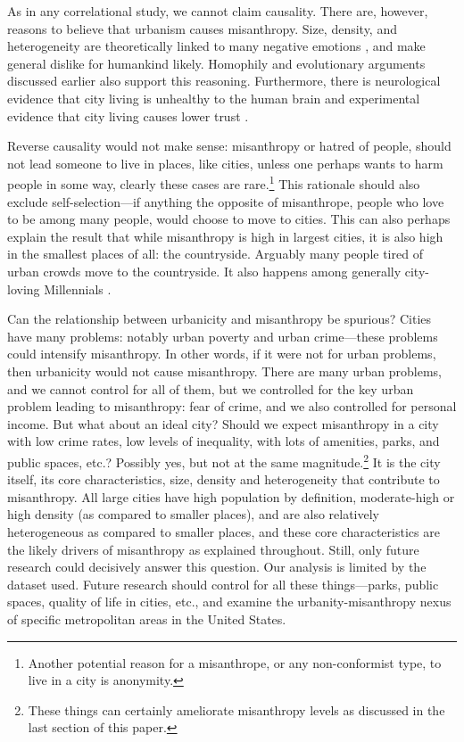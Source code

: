 \documentclass[11pt, letterpaper]{article}
\begin{document}
\begin{spacing}{1.4}
As in any correlational study, we cannot claim causality. There are, however, reasons to believe that urbanism causes misanthropy. Size, density, and heterogeneity are theoretically linked to many negative emotions \citep{wirth38}, and make general dislike for humankind likely. Homophily and evolutionary arguments discussed earlier also support this reasoning.  
Furthermore, there is neurological evidence that city living is unhealthy to the human brain \citep{lederbogen11} and experimental evidence that city living causes lower trust \citep{milgram70}.

Reverse causality would not make sense: misanthropy or hatred of people, should not lead someone to live in places, like cities, unless one perhaps wants to harm people in some way, clearly these cases are rare.\footnote{Another potential reason for a misanthrope, or any non-conformist type, to live in a city is anonymity.} This rationale should also exclude self-selection---if anything the opposite of misanthrope, people who love to be among many people, would choose to move to cities. This can also perhaps explain the result that while misanthropy is high in largest
cities, it is also high in the smallest places of all: the
countryside. {Arguably many people tired of urban crowds move to the
  countryside. It also happens among generally city-loving Millennials  \citep[e.g.,][]{deweyWP17nov23}.}

Can the relationship between urbanicity and misanthropy be spurious? Cities have many problems: notably urban poverty and urban crime---these problems could intensify misanthropy. In other words, if it were not for urban problems, then urbanicity would not cause misanthropy. There are many urban problems, and we cannot control for all of them, but we controlled for the key urban problem leading to misanthropy: fear of crime, and we also controlled for personal income. 
But what about an ideal city? Should we expect misanthropy in a city with low crime rates, low levels of inequality, with lots of amenities, parks, and public spaces, etc.? Possibly yes, but not at the same magnitude.\footnote{These things can certainly ameliorate misanthropy levels as discussed in the last section of this paper.} It is the city itself, its core characteristics, size, density and heterogeneity that contribute to misanthropy. All large cities have high population by definition, moderate-high or high density (as compared to smaller places), and are also relatively heterogeneous as compared to smaller places, and these core characteristics are the likely drivers of misanthropy as explained throughout.
%
Still, only future research could decisively  answer this question. Our analysis is limited by the dataset used. Future research should control for all these things---parks, public spaces, quality of life in cities, etc., and examine the urbanity-misanthropy nexus of specific metropolitan areas in the United States. 


\end{spacing}
\end{document}
